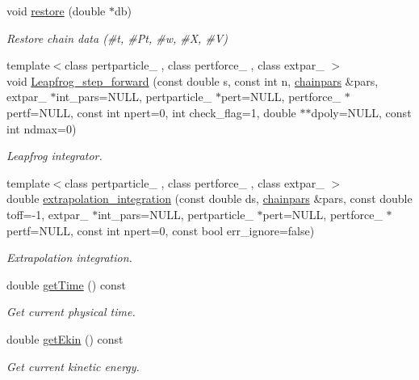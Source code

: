 \begin{DoxyCompactItemize}
void \hyperlink{classARC_1_1chain_a5eb2661715a3bf90cad65503f4a5e184}{restore} (double $\ast$db)
\begin{DoxyCompactList}\small\item\em Restore chain data (\#t, \#\+Pt, \#w, \#X, \#V) \end{DoxyCompactList}\item 
{\footnotesize template$<$class pertparticle\+\_\+ , class pertforce\+\_\+ , class extpar\+\_\+ $>$ }\\void \hyperlink{classARC_1_1chain_a0e375d50ca9a4c01f780dd5698fe6914}{Leapfrog\+\_\+step\+\_\+forward} (const double s, const int n, \hyperlink{classARC_1_1chainpars}{chainpars} \&pars, extpar\+\_\+ $\ast$int\+\_\+pars=N\+U\+LL, pertparticle\+\_\+ $\ast$pert=N\+U\+LL, pertforce\+\_\+ $\ast$pertf=N\+U\+LL, const int npert=0, int check\+\_\+flag=1, double $\ast$$\ast$dpoly=N\+U\+LL, const int ndmax=0)
\begin{DoxyCompactList}\small\item\em Leapfrog integrator. \end{DoxyCompactList}\item 
{\footnotesize template$<$class pertparticle\+\_\+ , class pertforce\+\_\+ , class extpar\+\_\+ $>$ }\\double \hyperlink{classARC_1_1chain_acd19e23d46d38d66c5eb60a2e9afe727}{extrapolation\+\_\+integration} (const double ds, \hyperlink{classARC_1_1chainpars}{chainpars} \&pars, const double toff=-\/1, extpar\+\_\+ $\ast$int\+\_\+pars=N\+U\+LL, pertparticle\+\_\+ $\ast$pert=N\+U\+LL, pertforce\+\_\+ $\ast$pertf=N\+U\+LL, const int npert=0, const bool err\+\_\+ignore=false)
\begin{DoxyCompactList}\small\item\em Extrapolation integration. \end{DoxyCompactList}\item 
double \hyperlink{classARC_1_1chain_a68f54fe8b09bd61838d6227ff4e533d1}{get\+Time} () const
\begin{DoxyCompactList}\small\item\em Get current physical time. \end{DoxyCompactList}\item 
double \hyperlink{classARC_1_1chain_acfb02b995ba72aef1e9e283d7d04adb8}{get\+Ekin} () const
\begin{DoxyCompactList}\small\item\em Get current kinetic energy. \end{DoxyCompactList}\item 
$$
\end{DoxyCompactItemize}
